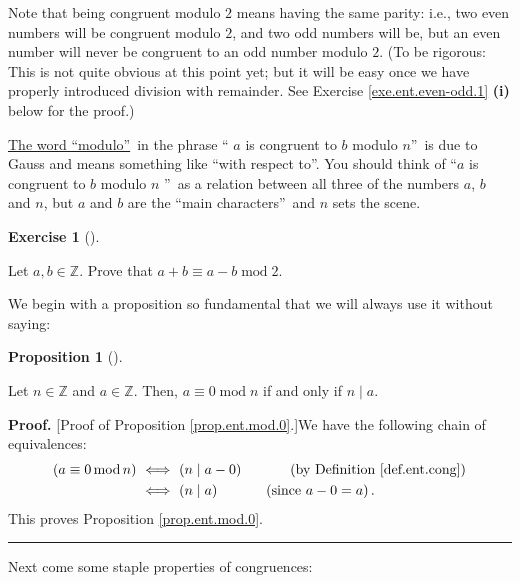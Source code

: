 \documentclass[numbers=enddot,12pt,final,onecolumn,notitlepage]{scrartcl}%
\newcounter{exer}
\numberwithin{exer}{subsection}
\theoremstyle{definition}
\newtheorem{prop}[theo]{Proposition}
\newenvironment{proposition}[1][]
{\begin{prop}[#1]\begin{leftbar}}
{\end{leftbar}\end{prop}}
\newtheorem{exmp}[exer]{Exercise}
\newenvironment{exercise}[1][]
{\begin{exmp}[#1]\begin{leftbar}}
{\end{leftbar}\end{exmp}}
\newenvironment{proof}[1][Proof]{\noindent\textbf{#1.} }{\ \rule{0.5em}{0.5em}}
\begin{document}
Note that being congruent modulo $2$ means having the same parity: i.e., two
even numbers will be congruent modulo $2$, and two odd numbers will be, but an
even number will never be congruent to an odd number modulo $2$. (To be
rigorous: This is not quite obvious at this point yet; but it will be easy
once we have properly introduced division with remainder. See Exercise
\ref{exe.ent.even-odd.1} \textbf{(i)} below for the proof.)

\href{https://en.wikipedia.org/wiki/Modulo_(jargon)}{The word
\textquotedblleft modulo\textquotedblright}\ in the phrase \textquotedblleft%
$a$ is congruent to $b$ modulo $n$\textquotedblright\ is due to Gauss and
means something like \textquotedblleft with respect to\textquotedblright. You
should think of \textquotedblleft$a$ is congruent to $b$ modulo $n$%
\textquotedblright\ as a relation between all three of the numbers $a$, $b$
and $n$, but $a$ and $b$ are the \textquotedblleft main
characters\textquotedblright\ and $n$ sets the scene.

\begin{exercise}
\label{exe.ent.mod.a+b=a-b}Let $a,b\in\mathbb{Z}$. Prove that $a+b\equiv
a-b\operatorname{mod}2$.
\end{exercise}

We begin with a proposition so fundamental that we will always use it without saying:

\begin{proposition}
\label{prop.ent.mod.0}Let $n\in\mathbb{Z}$ and $a\in\mathbb{Z}$. Then,
$a\equiv0\operatorname{mod}n$ if and only if $n\mid a$.
\end{proposition}

\begin{proof}
[Proof of Proposition \ref{prop.ent.mod.0}.]We have the following chain of
equivalences:%
\begin{align*}
\left(  a\equiv0\operatorname{mod}n\right)  \  &  \Longleftrightarrow\ \left(
n\mid a-0\right)  \ \ \ \ \ \ \ \ \ \ \left(  \text{by Definition
\ref{def.ent.cong}}\right) \\
&  \Longleftrightarrow\ \left(  n\mid a\right)  \ \ \ \ \ \ \ \ \ \ \left(
\text{since }a-0=a\right)  .
\end{align*}
This proves Proposition \ref{prop.ent.mod.0}.
\end{proof}

Next come some staple properties of congruences:
\end{document}
